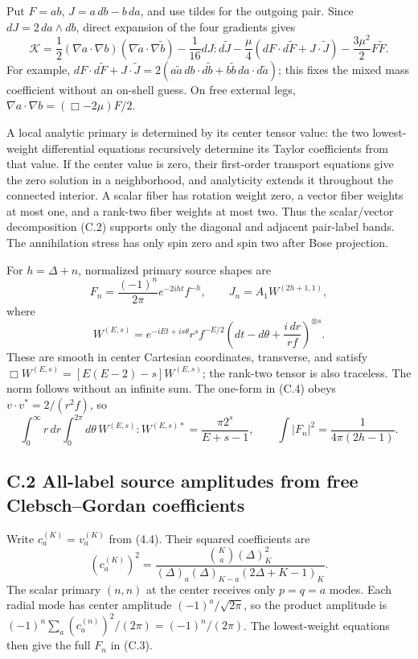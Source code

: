 Put \(F=ab\), \(J=a\,db-b\,da\), and use tildes for the outgoing pair. Since \(dJ=2\,da\wedge db\), direct expansion of the four gradients gives \[
\mathcal K=
\frac12(\nabla a\cdot\nabla b)
(\nabla\widetilde a\cdot\nabla\widetilde b)
-\frac1{16}dJ:d\widetilde J
-\frac{\mu}{4}(dF\cdot d\widetilde F+J\cdot\widetilde J)
-\frac{3\mu^2}{2}F\widetilde F .
\tag{C.2}
\] For example, \(dF\cdot d\widetilde F+J\cdot\widetilde J =2(a\widetilde a\,db\cdot d\widetilde b +b\widetilde b\,da\cdot d\widetilde a)\); this fixes the mixed mass coefficient without an on-shell guess. On free external legs, \(\nabla a\cdot\nabla b=(\Box-2\mu)F/2\).

A local analytic primary is determined by its center tensor value: the two lowest-weight differential equations recursively determine its Taylor coefficients from that value. If the center value is zero, their first-order transport equations give the zero solution in a neighborhood, and analyticity extends it throughout the connected interior. A scalar fiber has rotation weight zero, a vector fiber weights at most one, and a rank-two fiber weights at most two. Thus the scalar/vector decomposition (C.2) supports only the diagonal and adjacent pair-label bands. The annihilation stress has only spin zero and spin two after Bose projection.

For \(h=\Delta+n\), normalized primary source shapes are \[
F_n=\frac{(-1)^n}{2\pi}e^{-2iht}f^{-h},
\qquad
J_n=A_1W^{(2h+1,1)},
\tag{C.3}
\] where \[
W^{(E,s)}
=e^{-iEt+is\theta}r^sf^{-E/2}
\left(dt-d\theta+\frac{i\,dr}{rf}\right)^{\otimes s}.
\tag{C.4}
\] These are smooth in center Cartesian coordinates, transverse, and satisfy \(\Box W^{(E,s)}=[E(E-2)-s]W^{(E,s)}\); the rank-two tensor is also traceless. The norm follows without an infinite sum. The one-form in (C.4) obeys \(v\cdot v^*=2/(r^2f)\), so \[
\int_0^\infty r\,dr\int_0^{2\pi}d\theta\,
W^{(E,s)}:W^{(E,s)*}
=\frac{\pi2^s}{E+s-1},
\qquad
\int|F_n|^2=\frac1{4\pi(2h-1)}.
\tag{C.5}
\]

\hypertarget{c.2-all-label-source-amplitudes-from-free-clebschgordan-coefficients}{%
\subsection{C.2 All-label source amplitudes from free Clebsch--Gordan coefficients}\label{c.2-all-label-source-amplitudes-from-free-clebschgordan-coefficients}}

Write \(c_a^{(K)}=v_a^{(K)}\) from (4.4). Their squared coefficients are \[
(c_a^{(K)})^2=
\frac{\binom Ka(\Delta)_K^2}
{(\Delta)_a(\Delta)_{K-a}(2\Delta+K-1)_K}.
\tag{C.6}
\] The scalar primary \((n,n)\) at the center receives only \(p=q=a\) modes. Each radial mode has center amplitude \((-1)^a/\sqrt{2\pi}\), so the product amplitude is \((-1)^n\sum_a(c_a^{(n)})^2/(2\pi)=(-1)^n/(2\pi)\). The lowest-weight equations then give the full \(F_n\) in (C.3).

